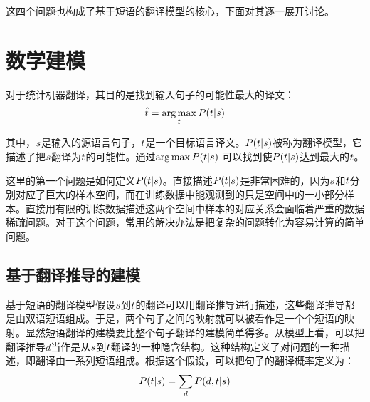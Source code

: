\parinterval 这四个问题也构成了基于短语的翻译模型的核心，下面对其逐一展开讨论。

\sectionnewpage
\section{数学建模}\label{section-7.2}

\parinterval 对于统计机器翻译，其目的是找到输入句子的可能性最大的译文：
\begin{eqnarray}
\hat{{t}} = \operatorname*{arg\,max}_{{t}} {P}({t}|{s})
\label{eq:7-2}
\end{eqnarray}

\noindent 其中，${s}$是输入的源语言句子，${t}$是一个目标语言译文。${P}({t}|{s})$被称为翻译模型，它描述了把${s}$翻译为${t}$的可能性。通过$\operatorname*{arg\,max} {P}({t}|{s})$ 可以找到使${P}({t}|{s})$达到最大的${t}$。

\parinterval 这里的第一个问题是如何定义${P}({t}|{s})$。直接描述${P}({t}|{s})$是非常困难的，因为${s}$和${t}$分别对应了巨大的样本空间，而在训练数据中能观测到的只是空间中的一小部分样本。直接用有限的训练数据描述这两个空间中样本的对应关系会面临着严重的数据稀疏问题。对于这个问题，常用的解决办法是把复杂的问题转化为容易计算的简单问题。


\subsection{基于翻译推导的建模}

\parinterval 基于短语的翻译模型假设${s}$到${t}$的翻译可以用翻译推导进行描述，这些翻译推导都是由双语短语组成。于是，两个句子之间的映射就可以被看作是一个个短语的映射。显然短语翻译的建模要比整个句子翻译的建模简单得多。从模型上看，可以把翻译推导$d$当作是从${s}$到${t}$翻译的一种隐含结构。这种结构定义了对问题的一种描述，即翻译由一系列短语组成。根据这个假设，可以把句子的翻译概率定义为：
\begin{eqnarray}
{P}({t}|{s}) = \sum_{d} {P}(d,{t}|{s})
\label{eq:7-3}
\end{eqnarray}


